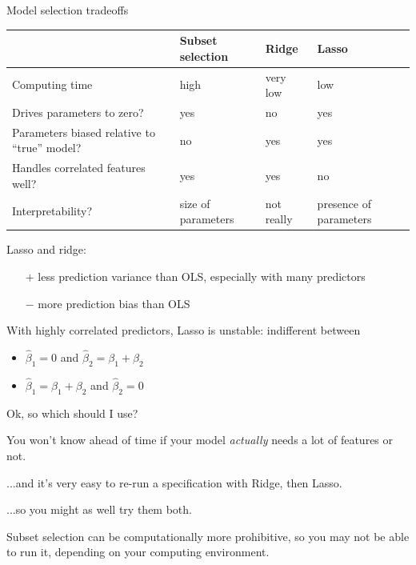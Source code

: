 \documentclass[mathserif, aspectratio=169]{beamer}
\begin{document}
\begin{frame}{Model selection tradeoffs}
\begin{table}[]
\begin{tabular}{p{6cm}p{2.2cm}p{2.2cm}p{2.2cm}}
\hline
                                              & Subset selection & Ridge    & Lasso \\ \hline
Computing time             \pause                   & high             & very low & low   \\
Drives parameters to zero?      \pause              & yes              & no       & yes   \\
Parameters biased relative to ``true'' model? \pause & no               & yes      & yes   \\
Handles correlated features well?     \pause        & yes              & yes      & no    \\
Interpretability?	  \pause    & size of parameters & not really  & presence of parameters\\
 \hline
\end{tabular}
\end{table}

Lasso and ridge: 
\begin{itemize}
\item[$+$] less prediction variance than OLS, especially with many  predictors 
\item[$-$] more prediction bias than OLS
\end{itemize}
With highly correlated predictors, Lasso is unstable: indifferent between 
\begin{itemize}
\item $\hat{\beta}_1=0$ and $\hat{\beta}_2= \beta_1+\beta_2$
\item $\hat{\beta}_1= \beta_1+\beta_2$ and $\hat{\beta}_2=0$
\end{itemize}
\end{frame}

\begin{frame}{Ok, so which should I use?}

You won't know ahead of time if your model \textit{actually} needs a lot of features or not.  

\vspace{5mm}

...and it's very easy to re-run a specification with Ridge, then Lasso.

\vspace{5mm}

...so you might as well try them both.

\vspace{5mm}

Subset selection can be computationally more prohibitive, so you may not be able to run it, depending on your computing environment.

\end{frame}
\end{document}
